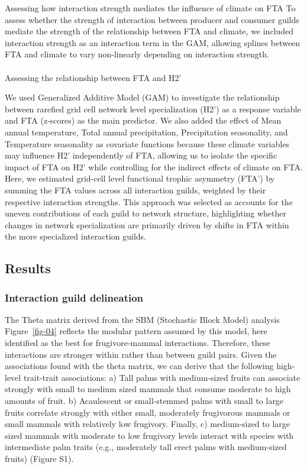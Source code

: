 \documentclass[
]{agujournal2019}
\makeatletter
\let\oldparagraph\paragraph
\renewcommand{\paragraph}{
    \@ifstar
      \xxxParagraphStar
      \xxxParagraphNoStar
  }
\newcommand{\xxxParagraphStar}[1]{\oldparagraph*{#1}\mbox{}}
\newcommand{\xxxParagraphNoStar}[1]{\oldparagraph{#1}\mbox{}}
\makeatother
\begin{document}
Assessing how interaction strength mediates the influence of climate on
FTA To assess whether the strength of interaction between producer and
consumer guilds mediate the strength of the relationship between FTA and
climate, we included interaction strength as an interaction term in the
GAM, allowing splines between FTA and climate to vary non-linearly
depending on interaction strength.

\paragraph{Assessing the relationship between FTA and
H2'}\label{assessing-the-relationship-between-fta-and-h2}

We used Generalized Additive Model (GAM) to investigate the relationship
between rarefied grid cell network level specialization (H2') as a
response variable and FTA (z-scores) as the main predictor. We also
added the effect of Mean annual temperature, Total annual precipitation,
Precipitation seasonality, and Temperature seasonality as covariate
functions because these climate variables may influence H2'
independently of FTA, allowing us to isolate the specific impact of FTA
on H2' while controlling for the indirect effects of climate on FTA.
Here, we estimated grid-cell level functional trophic asymmetry (FTA')
by summing the FTA values across all interaction guilds, weighted by
their respective interaction strengths. This approach was selected as
accounts for the uneven contributions of each guild to network
structure, highlighting whether changes in network specialization are
primarily driven by shifts in FTA within the more specialized
interaction guilds.

\subsection{Results}\label{results}

\subsubsection{Interaction guild
delineation}\label{interaction-guild-delineation}

The Theta matrix derived from the SBM (Stochastic Block Model) analysis
Figure~\ref{fig-04} reflects the modular pattern assumed by this model,
here identified as the best for frugivore-mammal interactions.
Therefore, these interactions are stronger within rather than between
guild pairs. Given the associations found with the theta matrix, we can
derive that the following high-level trait-trait associations: a) Tall
palms with medium-sized fruits can associate strongly with small to
medium sized mammals that consume moderate to high amounts of fruit. b)
Acaulescent or small-stemmed palms with small to large fruits correlate
strongly with either small, moderately frugivorous mammals or small
mammals with relatively low frugivory. Finally, c) medium-sized to large
sized mammals with moderate to low frugivory levels interact with
species with intermediate palm traits (e.g., moderately tall erect palms
with medium-sized fruits) (Figure S1).
\end{document}
